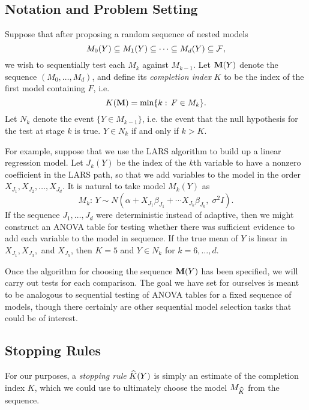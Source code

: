 \documentclass{article}
\begin{document}
\subsection{Notation and Problem Setting}

Suppose that after proposing a random sequence of nested models 
\begin{equation}
  M_0(Y) \subseteq M_1(Y) \subseteq \cdots \subseteq M_d(Y) \subseteq \mathcal{F},
\end{equation}
we wish to sequentially test each $M_k$ against $M_{k-1}$. Let $\mathbf{M}(Y)$ denote the sequence $(M_0,\ldots,M_d)$, and define its {\em completion index} $K$ to be the index of the first model containing $F$, i.e.
\begin{equation}
  K(\mathbf{M}) = \min \{k:\, F\in M_k\}.
\end{equation}
Let $N_k$ denote the event $\{Y\in M_{k-1}\}$, i.e. the event that the null hypothesis for the test at stage $k$ is true. $Y\in N_k$ if and only if $k>K$.

For example, suppose that we use the LARS algorithm to build up a linear regression model. Let $J_k(Y)$ be the index of the $k$th variable to have a nonzero coefficient in the LARS path, so that we add variables to the model in the order $X_{J_1}, X_{J_2}, \ldots, X_{J_d}$. It is natural to take model $M_k(Y)$ as
\begin{equation}
  M_k:\, Y \sim 
  N\left(\alpha + X_{J_{1}} \beta_{J_{1}} + \cdots X_{J_k}\beta_{J_k}, 
  \;\sigma^2I\right).
\end{equation}
If the sequence $J_1,\ldots,J_d$ were deterministic instead of adaptive, then we might construct an ANOVA table for testing whether there was sufficient evidence to add each variable to the model in sequence. If the true mean of $Y$ is linear in $X_{J_1}, X_{J_3},$ and $X_{J_5}$, then $K = 5$ and $Y\in N_k$ for $k=6,\ldots,d$.

Once the algorithm for choosing the sequence $\mathbf{M}(Y)$ has been specified, we will carry out tests for each comparison. The goal we have set for ourselves is meant to be analogous to sequential testing of ANOVA tables for a fixed sequence of models, though there certainly are other sequential model selection tasks that could be of interest.


\subsection{Stopping Rules}
For our purposes, a {\em stopping rule} $\widehat{K}(Y)$ is simply an estimate of the completion index $K$, which we could use to ultimately choose the model $M_{\widehat{K}}$ from the sequence.
\end{document}
